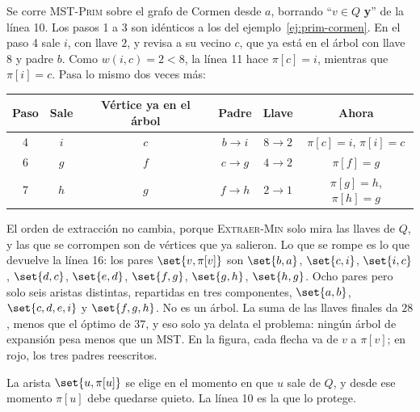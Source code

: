 \documentclass[11pt,letterpaper]{article}
\begin{document}
\begin{ejemplo}
  \label{ej:prim-sin-cola}
  Se corre \textsc{MST-Prim} sobre el grafo de Cormen desde $a$,
  borrando ``$v \in Q$ \textbf{y}'' de la línea 10. Los pasos 1 a 3
  son idénticos a los del ejemplo~\ref{ej:prim-cormen}. En el paso 4
  sale $i$, con llave $2$, y revisa a su vecino $c$, que ya está en el
  árbol con llave $8$ y padre $b$. Como $w(i, c) = 2 < 8$, la línea 11
  hace $\pi[c] = i$, mientras que $\pi[i] = c$. Pasa lo mismo dos
  veces más:
  \begin{center}
  \small
  \begin{tabular}{cccccc}
    \toprule
    \textbf{Paso} & \textbf{Sale} & \textbf{Vértice ya en el árbol}
      & \textbf{Padre} & \textbf{Llave} & \textbf{Ahora} \\
    \midrule
    4 & $i$ & $c$ & $b \to i$ & $8 \to 2$ & $\pi[c] = i$, $\pi[i] = c$ \\
    6 & $g$ & $f$ & $c \to g$ & $4 \to 2$ & $\pi[f] = g$ \\
    7 & $h$ & $g$ & $f \to h$ & $2 \to 1$ & $\pi[g] = h$, $\pi[h] = g$ \\
    \bottomrule
  \end{tabular}
  \end{center}
  El orden de extracción no cambia, porque \textsc{Extraer-Min} solo
  mira las llaves de $Q$, y las que se corrompen son de vértices que ya
  salieron. Lo que se rompe es lo que devuelve la línea 16: los pares
  $\set{v, \pi[v]}$ son $\set{b,a}$, $\set{c,i}$, $\set{i,c}$,
  $\set{d,c}$, $\set{e,d}$, $\set{f,g}$, $\set{g,h}$, $\set{h,g}$.
  Ocho pares pero solo seis aristas distintas, repartidas en tres
  componentes, $\set{a,b}$, $\set{c,d,e,i}$ y $\set{f,g,h}$. No es un
  árbol. La suma de las llaves finales da $28$, menos que el óptimo
  de $37$, y eso solo ya delata el problema: ningún árbol de expansión
  pesa menos que un MST. En la figura, cada flecha va de $v$ a
  $\pi[v]$; en rojo, los tres padres reescritos.
  \begin{center}
  \end{center}
  La arista $\set{u, \pi[u]}$ se elige en el momento en que $u$ sale
  de $Q$, y desde ese momento $\pi[u]$ debe quedarse quieto. La línea
  10 es la que lo protege.
\end{ejemplo}
\end{document}
